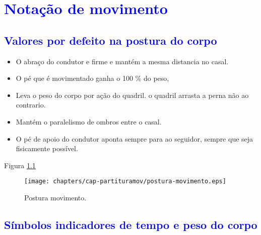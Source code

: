 




\chapter{\textcolor{blue}{Notação de movimento}}





\section{\textcolor{blue}{Valores por defeito na postura do corpo}}


\begin{itemize}
\item O abraço do condutor e firme e mantém a mesma distancia no casal.
\item O pé que é movimentado ganha o 100 $\%$ do peso,
\item Leva o peso do corpo por ação do quadril. o quadril arrasta a perna não ao contrario.
\item Mantém o paralelismo de ombros entre o casal.
\item O pé de apoio do condutor aponta sempre para ao seguidor, sempre que seja fisicamente possível.
\end{itemize}

Figura \ref{fig:postura-movimento}

\begin{figure}[h]
  \centering
    \texttt{[image: chapters/cap-partituramov/postura-movimento.eps]}
  \caption{Postura movimento.}
  \label{fig:postura-movimento}
\end{figure}


\section{\textcolor{blue}{Símbolos indicadores de tempo e peso do corpo}}

